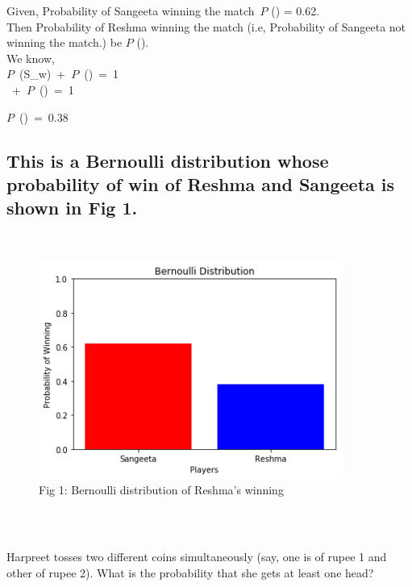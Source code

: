 \documentclass[journal,12pt,twocolumn]{IEEEtran}
\begin{document}
Given, Probability of Sangeeta winning the match\ $P$ () = 0.62.\\

Then Probability of Reshma winning the match (i.e, Probability of Sangeeta not winning the match.) be $P$ ().\\

We know,\\

$P$\ (S_w)\ +\ $P$\ ()\ =\ 1\\

\ +\ $P$\ ()\ =\ 1\\
\begin{mdframed}
\implies $P$\ ()\ =\ 0.38\\
\end{mdframed}
\subsection*{This is a Bernoulli distribution whose probability of win of Reshma and Sangeeta is shown in Fig 1.}\\

\begin{figure}[h!]
    \centering
    \includegraphics[width=10cm]{Assignment-2/Codes/Figures/bern_1_18.png}
    \caption*{Fig 1: Bernoulli distribution of Reshma's winning}
\end{figure}
\\
\subsection*{}
Harpreet tosses two different coins simultaneously (say, one is of rupee 1 and other of rupee 2). What is the probability that she gets at least one head?
\subsection*{}\\
\end{document}
